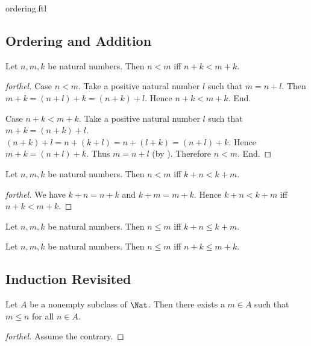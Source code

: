\documentclass{naproche-library}
\begin{document}
\begin{smodule}{ordering.ftl}
  \subsection*{Ordering and Addition}

  \begin{proposition}[forthel,id=ARITHMETIC_04_7354062662008832,printid]
    Let $n, m, k$ be natural numbers.
    Then $n < m$ iff $n + k < m + k$.
  \end{proposition}
  \begin{proof}[forthel]
    Case $n < m$.
      Take a positive natural number $l$ such that $m = n + l$.
      Then $m + k
        = (n + l) + k
        = (n + k) + l$.
      Hence $n + k < m + k$.
    End.

    Case $n + k < m + k$.
      Take a positive natural number $l$ such that $m + k = (n + k) + l$.
      $(n + k) + l
        = n + (k + l)
        = n + (l + k)
        = (n + l) + k$.
      Hence $m + k = (n + l) + k$.
      Thus $m = n + l$ (by ).
      Therefore $n < m$.
    End.
  \end{proof}

  \begin{corollary}[forthel,id=ARITHMETIC_04_1901366129721344,printid]
    Let $n, m, k$ be natural numbers.
    Then $n < m$ iff $k + n < k + m$.
  \end{corollary}
  \begin{proof}[forthel]
    We have $k + n = n + k$ and $k + m = m + k$.
    Hence $k + n < k + m$ iff $n + k < m + k$.
  \end{proof}

  \begin{corollary}[forthel,id=ARITHMETIC_04_4203390999461888,printid]
    Let $n, m, k$ be natural numbers.
    Then $n \leq m$ iff $k + n \leq k + m$.
  \end{corollary}

  \begin{corollary}[forthel,id=ARITHMETIC_04_5512590832697344,printid]
    Let $n, m, k$ be natural numbers.
    Then $n \leq m$ iff $n + k \leq m + k$.
  \end{corollary}


  \subsection*{Induction Revisited}

  \begin{proposition}[forthel,id=ARITHMETIC_04_272317502455808,printid]
    Let $A$ be a nonempty subclass of $\Nat$.
    Then there exists a $m \in A$ such that $m \leq n$ for all $n \in A$.
  \end{proposition}
  \begin{proof}[forthel]
    Assume the contrary.


\end{proof}
\end{smodule}
\end{document}
